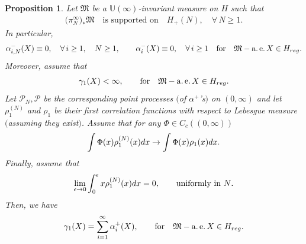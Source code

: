 \documentclass[11pt]{article}
\numberwithin{equation}{section}
\newtheorem{Proposition}[Theorem]{Proposition}
{ \theoremstyle{definition}
\newtheorem{Definition}[Theorem]{Definition}
\newtheorem{Remark}[Theorem]{Remark} }
\begin{document}
\begin{Proposition}\label{AbstractGamma1}
Let $\mathfrak{M}$ be a $\mathbb{U}(\infty)$-invariant measure on $H$ such that
\begin{gather*}
\big(\pi_N^{\infty}\big)_*\mathfrak{M} \quad \text{is supported on} \quad H_+(N),\quad \forall\, N \ge 1.
\end{gather*}
In particular,
\begin{gather*}
\alpha_{i,N}^-(X)\equiv 0, \quad \forall\, i\ge 1, \quad N\ge 1, \qquad \alpha_i^-(X)\equiv 0, \quad \forall\, i \ge 1 \quad \text{for} \quad \mathfrak{M}-\operatorname{a.e.} X \in H_{{\rm reg}}.
\end{gather*}
Moreover, assume that
\begin{gather*}
\gamma_1(X)<\infty, \qquad \text{for} \quad \mathfrak{M}-\operatorname{a.e.} X \in H_{{\rm reg}}.
\end{gather*}
Let $\mathcal{P}_N, \mathcal{P}$ be the corresponding point processes $($of $\alpha^+$'s$)$ on $(0,\infty)$ and let $\rho_1^{(N)}$ and $\rho_1$ be their first correlation functions with respect to Lebesgue measure $($assuming they exist$)$. Assume that for any $\Phi \in C_c ((0,\infty) )$
\begin{gather*}
\int \Phi(x)\rho_1^{(N)}(x){\rm d}x\to \int \Phi(x)\rho_1(x){\rm d}x.
\end{gather*}
Finally, assume that
\begin{gather*}
\lim_{\epsilon \to 0} \int_{0}^{\epsilon}x \rho_1^{(N)}(x){\rm d}x=0, \qquad \text{uniformly in $N$}.
\end{gather*}
Then, we have
\begin{gather*}
\gamma_1(X)=\sum_{i=1}^{\infty}\alpha_i^+(X), \qquad \text{for} \quad \mathfrak{M}-\operatorname{a.e.} X \in H_{{\rm reg}}.
\end{gather*}
\end{Proposition}
\end{document}
